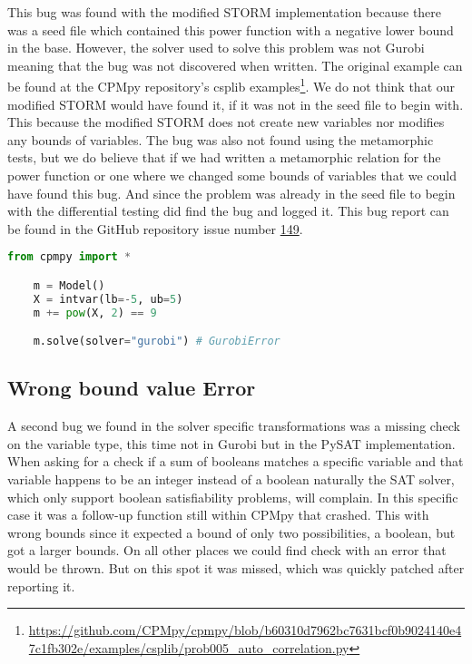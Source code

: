 This bug was found with the modified STORM implementation because there was a seed file which contained this power function with a negative lower bound in the base. However, the solver used to solve this problem was not Gurobi meaning that the bug was not discovered when written. The original example can be found at the CPMpy repository's csplib examples\footnote{\url{https://github.com/CPMpy/cpmpy/blob/b60310d7962bc7631bcf0b9024140e47c1fb302e/examples/csplib/prob005_auto_correlation.py}}. We do not think that our modified STORM would have found it, if it was not in the seed file to begin with. This because the modified STORM does not create new variables nor modifies any bounds of variables. The bug was also not found using the metamorphic tests, but we do believe that if we had written a metamorphic relation for the power function or one where we changed some bounds of variables that we could have found this bug. And since the problem was already in the seed file to begin with the differential testing did find the bug and logged it. This bug report can be found in the GitHub repository issue number \href{https://github.com/CPMpy/cpmpy/issues/149}{149}.

\label{lst:Bug:PowGurobi}
\begin{lstlisting}[language=python, caption={The "power function of Gurobi"-bug.}]
	from cpmpy import *

	m = Model()
	X = intvar(lb=-5, ub=5)
	m += pow(X, 2) == 9

	m.solve(solver="gurobi") # GurobiError
\end{lstlisting}



\subsection{Wrong bound value Error}
\label{res:bug:WrongBounds}
A second bug we found in the solver specific transformations was a missing check on the variable type, this time not in Gurobi but in the PySAT implementation. When asking for a check if a sum of booleans matches a specific variable and that variable happens to be an integer instead of a boolean naturally the SAT solver, which only support boolean satisfiability problems, will complain. In this specific case it was a follow-up function still within CPMpy that crashed. This with wrong bounds since it expected a bound of only two possibilities, a boolean, but got a larger bounds. On all other places we could find check with an error that would be thrown. But on this spot it was missed, which was quickly patched after reporting it.

